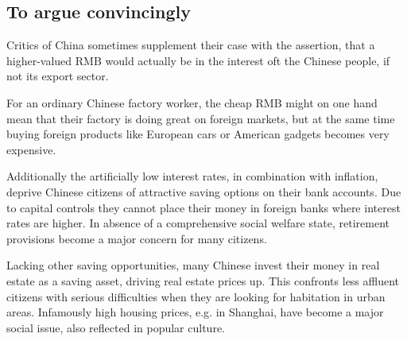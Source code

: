 
\subsection{To argue convincingly}



Critics of China sometimes supplement their case with the assertion, that a higher-valued RMB would actually be in the interest oft the Chinese people, if not its export sector.

For an ordinary Chinese factory worker, the cheap RMB might on one hand 
mean that their factory is doing great on foreign markets, but at the 
same time buying foreign products like European cars or American gadgets 
becomes very expensive. 

Additionally the artificially low interest rates, in combination with 
inflation, deprive Chinese citizens of attractive saving options on 
their bank accounts. Due to capital controls they cannot place their 
money in foreign banks where interest rates are higher. In absence of a 
comprehensive social welfare state, retirement provisions become a major 
concern for many citizens.

Lacking other saving opportunities, many Chinese invest their money in 
real estate as a saving asset, driving real estate prices up.  This 
confronts less affluent citizens with serious difficulties when they are 
looking for habitation in urban areas.  Infamously high housing prices, 
e.g.  in Shanghai, have become a major social issue, also reflected in 
popular culture. 

